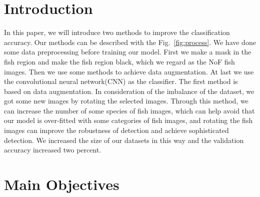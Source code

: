 \documentclass[a0,portrait]{a0poster}
\begin{document}
\begin{multicols}{2}
\begin{abstract}
\end{abstract}


\color{SaddleBrown} %

\section*{Introduction}
In this paper, we will introduce two methods to improve the classification accuracy. Our methods can be described with the Fig.~\ref{fig:process}. We have done some data preprocessing before training our model. First we make a mask in the fish region and make the fish region black, which we regard as the NoF fish images. Then we use some methods to achieve data augmentation. At last we use the convolutional neural network(CNN) as the classifier. The first method is based on data augmentation. In consideration of the imbalance of the dataset, we got some new images by rotating the selected images. Through this method, we can increase the number of some species of fish images, which can help avoid that our model is over-fitted with some categories of fish images, and rotating the fish images can improve the robustness of detection and achieve sophisticated detection. We increased the size of our datasets in this way and the validation accuracy increased two percent.




\color{DarkSlateGray} %

\section*{Main Objectives}


\end{multicols}
\end{document}

